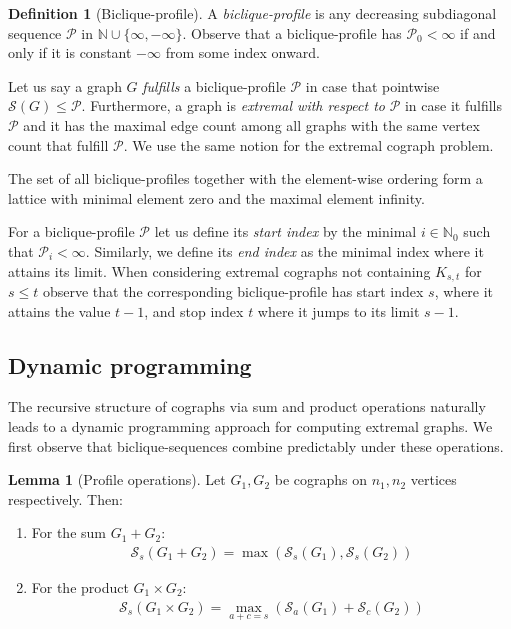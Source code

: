 \documentclass{article}
\newcommand{\NN}{\mathbb{N}}
\theoremstyle{definition}
\theoremstyle{definition}
\theoremstyle{definition}
\theoremstyle{definition}
\theoremstyle{definition}
\newtheorem{Definition}{Definition}
\theoremstyle{definition}
\theoremstyle{definition}
\newtheorem{Lemma}{Lemma}
\theoremstyle{definition}
\theoremstyle{definition}
\theoremstyle{definition}
\begin{document}
\begin{Definition}[Biclique-profile] \label{def:biclique_profile}
A \emph{biclique-profile} is any decreasing subdiagonal sequence $\mathscr{P}$ in $\NN \cup \{ \infty, -\infty \}$.
Observe that a biclique-profile has $\mathscr{P}_0 < \infty$ if and only if it is constant $-\infty$ from some index onward.
\end{Definition}

Let us say a graph $G$ \emph{fulfills} a biclique-profile $\mathscr{P}$ in case that pointwise $\mathscr{S}(G) \leq \mathscr{P}$. Furthermore, a graph is \emph{extremal with respect to} $\mathscr{P}$ in case it fulfills $\mathscr{P}$ and it has the maximal edge count among all graphs with the same vertex count that fulfill $\mathscr{P}$.
We use the same notion for the extremal cograph problem.

The set of all biclique-profiles together with the element-wise ordering form a lattice with minimal element zero and the maximal element infinity.

For a biclique-profile $\mathscr{P}$ let us define its \emph{start index} by the minimal $i \in \NN_{0}$ such that $\mathscr{P}_i < \infty$. Similarly, we define its \emph{end index} as the minimal index where it attains its limit.
When considering extremal cographs not containing $K_{s,t}$ for $s \leq t$ observe that the corresponding biclique-profile has start index $s$, where it attains the value $t-1$, and stop index $t$ where it jumps to its limit $s-1$.

\subsection{Dynamic programming} \label{subsec:dynamic_programming}

The recursive structure of cographs via sum and product operations naturally leads to a dynamic programming approach for computing extremal graphs.
We first observe that biclique-sequences combine predictably under these operations.

\begin{Lemma}[Profile operations] \label{thm:profile_operations}
    Let $G_1, G_2$ be cographs on $n_1, n_2$ vertices respectively. Then:
    \begin{enumerate}[label=(\roman*)]
        \item For the sum $G_1 + G_2$:
        \begin{align}
            \mathscr{S}_s(G_1 + G_2) = \max\left(\mathscr{S}_s(G_1), \mathscr{S}_s(G_2)\right) \label{eq:profile_sum}
        \end{align}
        \item For the product $G_1 \times G_2$:
        \begin{align}
            \mathscr{S}_s(G_1 \times G_2) = \max_{a+c=s}\left(\mathscr{S}_a(G_1) + \mathscr{S}_c(G_2)\right) \label{eq:profile_product}
        \end{align}
    \end{enumerate}
\end{Lemma}
\end{document}
